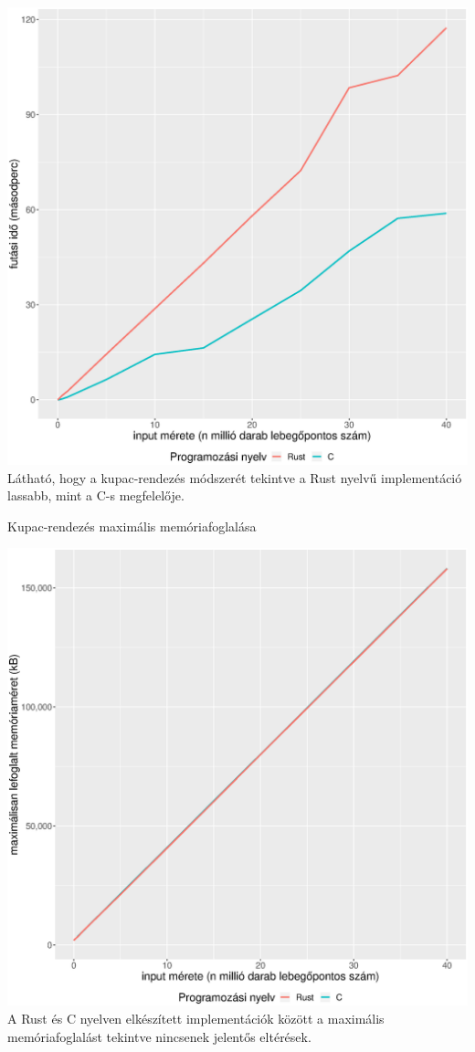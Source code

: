 \includegraphics[width=15.5cm]{kepek/heap_sort_run.eps}
Látható, hogy a kupac-rendezés módszerét tekintve a Rust nyelvű implementáció lassabb, mint a C-s megfelelője.

\noindent Kupac-rendezés maximális memóriafoglalása

\includegraphics[width=15.5cm]{kepek/heap_sort_memory.eps}
A Rust és C nyelven elkészített implementációk között a maximális memóriafoglalást tekintve nincsenek jelentős eltérések.

